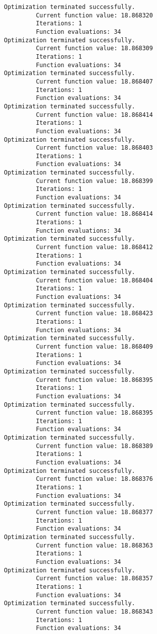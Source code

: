 \documentclass[11pt]{article}
\begin{document}
\begin{Verbatim}[commandchars=\\\{\}]
Optimization terminated successfully.
         Current function value: 18.868320
         Iterations: 1
         Function evaluations: 34
Optimization terminated successfully.
         Current function value: 18.868309
         Iterations: 1
         Function evaluations: 34
Optimization terminated successfully.
         Current function value: 18.868407
         Iterations: 1
         Function evaluations: 34
Optimization terminated successfully.
         Current function value: 18.868414
         Iterations: 1
         Function evaluations: 34
Optimization terminated successfully.
         Current function value: 18.868403
         Iterations: 1
         Function evaluations: 34
Optimization terminated successfully.
         Current function value: 18.868399
         Iterations: 1
         Function evaluations: 34
Optimization terminated successfully.
         Current function value: 18.868414
         Iterations: 1
         Function evaluations: 34
Optimization terminated successfully.
         Current function value: 18.868412
         Iterations: 1
         Function evaluations: 34
Optimization terminated successfully.
         Current function value: 18.868404
         Iterations: 1
         Function evaluations: 34
Optimization terminated successfully.
         Current function value: 18.868423
         Iterations: 1
         Function evaluations: 34
Optimization terminated successfully.
         Current function value: 18.868409
         Iterations: 1
         Function evaluations: 34
Optimization terminated successfully.
         Current function value: 18.868395
         Iterations: 1
         Function evaluations: 34
Optimization terminated successfully.
         Current function value: 18.868395
         Iterations: 1
         Function evaluations: 34
Optimization terminated successfully.
         Current function value: 18.868389
         Iterations: 1
         Function evaluations: 34
Optimization terminated successfully.
         Current function value: 18.868376
         Iterations: 1
         Function evaluations: 34
Optimization terminated successfully.
         Current function value: 18.868377
         Iterations: 1
         Function evaluations: 34
Optimization terminated successfully.
         Current function value: 18.868363
         Iterations: 1
         Function evaluations: 34
Optimization terminated successfully.
         Current function value: 18.868357
         Iterations: 1
         Function evaluations: 34
Optimization terminated successfully.
         Current function value: 18.868343
         Iterations: 1
         Function evaluations: 34

\end{Verbatim}
\end{document}

